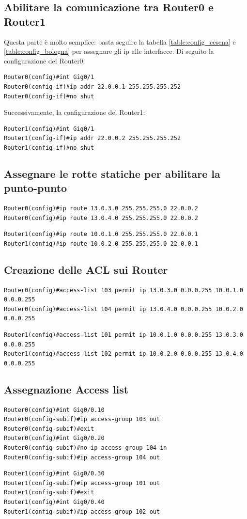 \documentclass[a4paper,12pt]{report}
\begin{document}
\subsection{Abilitare la comunicazione tra Router0 e Router1}
Questa parte è molto semplice: basta seguire la tabella \ref{table:config_cesena} e \ref{table:config_bologna} per assegnare gli ip alle interfacce.
Di seguito la configurazione del Router0:
\begin{verbatim}
Router0(config)#int Gig0/1
Router0(config-if)#ip addr 22.0.0.1 255.255.255.252
Router0(config-if)#no shut
\end{verbatim}
Successivamente, la configurazione del Router1:
\begin{verbatim}
Router1(config)#int Gig0/1
Router1(config-if)#ip addr 22.0.0.2 255.255.255.252
Router1(config-if)#no shut
\end{verbatim}
\subsection{Assegnare le rotte statiche per abilitare la punto-punto}
\begin{verbatim}
Router0(config)#ip route 13.0.3.0 255.255.255.0 22.0.0.2
Router0(config)#ip route 13.0.4.0 255.255.255.0 22.0.0.2
\end{verbatim}
\begin{verbatim}
Router1(config)#ip route 10.0.1.0 255.255.255.0 22.0.0.1
Router1(config)#ip route 10.0.2.0 255.255.255.0 22.0.0.1
\end{verbatim}
\subsection{Creazione delle ACL sui Router}
\label{sssec:creazione_acl}
\begin{verbatim}
Router0(config)#access-list 103 permit ip 13.0.3.0 0.0.0.255 10.0.1.0 0.0.0.255
Router0(config)#access-list 104 permit ip 13.0.4.0 0.0.0.255 10.0.2.0 0.0.0.255
\end{verbatim}
\begin{verbatim}
Router1(config)#access-list 101 permit ip 10.0.1.0 0.0.0.255 13.0.3.0 0.0.0.255
Router1(config)#access-list 102 permit ip 10.0.2.0 0.0.0.255 13.0.4.0 0.0.0.255
\end{verbatim}
\subsection{Assegnazione Access list}
\label{sssec:assegnazione_acl}
\begin{verbatim}
Router0(config)#int Gig0/0.10
Router0(config-subif)#ip access-group 103 out
Router0(config-subif)#exit
Router0(config)#int Gig0/0.20
Router0(config-subif)#no ip access-group 104 in
Router0(config-subif)#ip access-group 104 out    
\end{verbatim}
\begin{verbatim}
Router1(config)#int Gig0/0.30
Router1(config-subif)#ip access-group 101 out
Router1(config-subif)#exit
Router1(config)#int Gig0/0.40
Router1(config-subif)#ip access-group 102 out
\end{verbatim}
\end{document}
